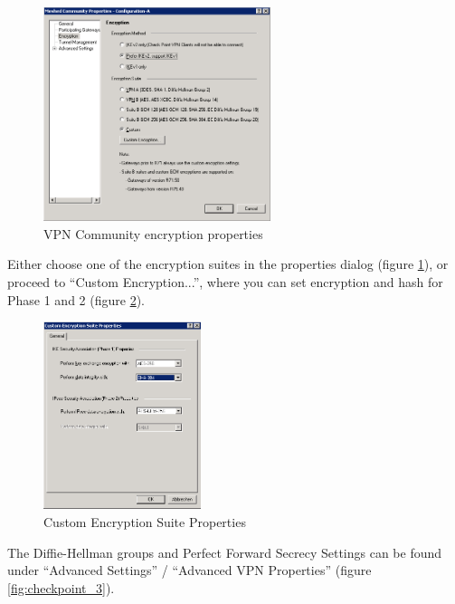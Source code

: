 \begin{figure}[p]
  \centering
  \includegraphics[width=0.592\textwidth]{img/checkpoint_1.png}
  \caption{VPN Community encryption properties}
  \label{fig:checkpoint_1}
\end{figure}

Either choose one of the encryption suites in the properties dialog
(figure \ref{fig:checkpoint_1}), or proceed to
``Custom Encryption...'', where you can set encryption and hash for
Phase 1 and 2 (figure \ref{fig:checkpoint_2}).

\begin{figure}[p]
  \centering
  \includegraphics[width=0.411\textwidth]{img/checkpoint_2.png}
  \caption{Custom Encryption Suite Properties}
  \label{fig:checkpoint_2}
\end{figure}

The Diffie-Hellman groups and Perfect Forward Secrecy Settings can be
found under ``Advanced Settings'' / ``Advanced VPN Properties''
(figure \ref{fig:checkpoint_3}).

